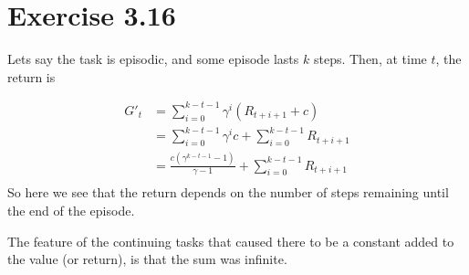 \documentclass[a4paper,11pt,reqno]{amsart}
\begin{document}
\section*{Exercise 3.16}
Lets say the task is episodic, and some episode lasts $k$ steps. Then, at time $t$, the return is

\begin{align}
    G'_t &= \sum_{i=0}^{k - t - 1} \gamma^{i} (R_{t + i + 1} + c)\\
    &= \sum_{i=0}^{k - t - 1} \gamma ^{i}c  + \sum_{i=0}^{k - t - 1} R_{t + i + 1} \\
    &= \frac{c(\gamma ^{k - t - 1} - 1)}{\gamma  - 1} + \sum_{i=0}^{k - t- 1} R_{t + i + 1} \\
\end{align}
So here we see that the return depends on the number of steps remaining until the end of the episode. 

The feature of the continuing tasks that caused there to be a constant added to the value (or return), is that the sum was infinite. 
\end{document}
